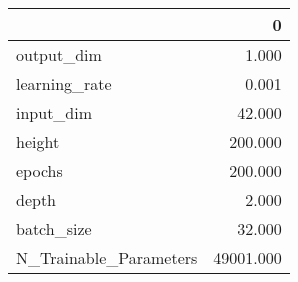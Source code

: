 \begin{tabular}{lr}
\toprule
{} &          0 \\
\midrule
output\_dim             &      1.000 \\
learning\_rate          &      0.001 \\
input\_dim              &     42.000 \\
height                 &    200.000 \\
epochs                 &    200.000 \\
depth                  &      2.000 \\
batch\_size             &     32.000 \\
N\_Trainable\_Parameters &  49001.000 \\
\bottomrule
\end{tabular}
